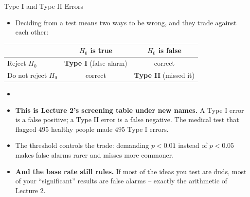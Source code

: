 \begin{frame}{Type I and Type II Errors}
\begin{itemize}
  \item Deciding from a test means two ways to be wrong, and they trade against each other:
\end{itemize}
\centering
\small
\begin{tabular}{l|cc}
                        & $H_0$ is true       & $H_0$ is false      \\
\hline
Reject $H_0$            & \textbf{Type I} (false alarm) & correct \\
Do not reject $H_0$     & correct             & \textbf{Type II} (missed it) \\
\end{tabular}

\vspace{0.4em}
\raggedright
\begin{itemize}
  \item[] \pause
  \item \textbf{This is Lecture 2's screening table under new names.} A Type I error is a false positive; a Type II error is a false negative. The medical test that flagged $495$ healthy people made $495$ Type I errors. \pause
  \item The threshold controls the trade: demanding $p < 0.01$ instead of $p < 0.05$ makes false alarms rarer and misses more commoner. \pause
  \item \textbf{And the base rate still rules.} If most of the ideas you test are duds, most of your ``significant'' results are false alarms -- exactly the arithmetic of Lecture 2.
\end{itemize}
\end{frame}


